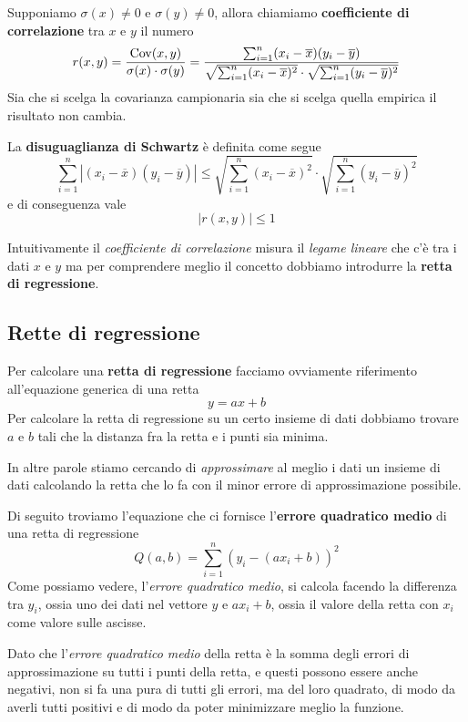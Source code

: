 \begin{definition}
	Supponiamo $\sigma (x) \neq 0$ e $\sigma (y) \neq 0$, allora chiamiamo
	\textbf{coefficiente di correlazione} tra $x$ e $y$ il numero
	\[
		r(x, y) = \frac{\operatorname{Cov} (x, y)}{\sigma (x) \cdot \sigma (y)} =
		\frac{\sum_{i=1}^n (x_i - \overline{x})(y_i - \overline{y})}
		{\sqrt{\sum_{i=1}^n (x_i - \overline{x})^2} \cdot
			\sqrt{\sum_{i=1}^n (y_i - \overline{y})^2}}
	\]
	Sia che si scelga la covarianza campionaria sia che si scelga quella empirica il risultato
	non cambia.
\end{definition}

\begin{definition}
	La \textbf{disuguaglianza di Schwartz} è definita come segue
	\[
		\sum_{i=1}^n |(x_i - \overline{x}) (y_i - \overline{y})| \leq
		\sqrt{\sum_{i=1}^n (x_i - \overline{x})^2} \cdot \sqrt{\sum_{i=1}^n (y_i - \overline{y})^2}
	\]
	e di conseguenza vale \[ |r(x, y)| \leq 1 \]
\end{definition}

Intuitivamente il \emph{coefficiente di correlazione} misura il \emph{legame lineare} che c'è tra
i dati $x$ e $y$ ma per comprendere meglio il concetto dobbiamo introdurre la
\textbf{retta di regressione}.

\subsection{Rette di regressione}
Per calcolare una \textbf{retta di regressione} facciamo ovviamente riferimento all'equazione
generica di una retta
\[ y = a x + b \]
Per calcolare la retta di regressione su un certo insieme di dati dobbiamo trovare $a$ e $b$ tali
che la distanza fra la retta e i punti sia minima.

In altre parole stiamo cercando di \emph{approssimare} al meglio i dati un insieme di dati
calcolando la retta che lo fa con il minor errore di approssimazione possibile.

Di seguito troviamo l'equazione che ci fornisce l'\textbf{errore quadratico medio} di una retta di
regressione
\[ Q(a, b) = \sum_{i=1}^n (y_i - (a x_i + b))^2 \]
Come possiamo vedere, l'\emph{errore quadratico medio}, si calcola facendo la differenza tra
$y_i$, ossia uno dei dati nel vettore $y$ e $a x_i + b$, ossia il valore della retta con $x_i$
come valore sulle ascisse.

Dato che l'\emph{errore quadratico medio} della retta è la somma degli errori di approssimazione
su tutti i punti della retta, e questi possono essere anche negativi, non si fa una pura di tutti
gli errori, ma del loro quadrato, di modo da averli tutti positivi e di modo da poter minimizzare
meglio la funzione.

